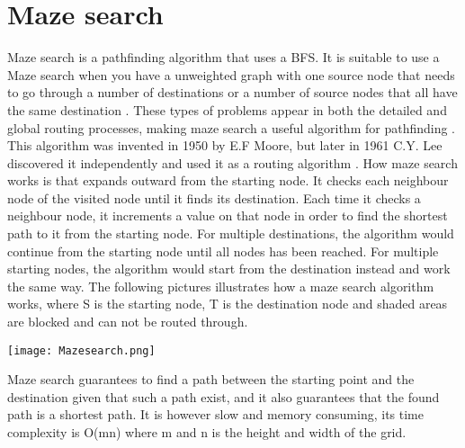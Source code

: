 \documentclass{kththesis}
\begin{document}
\section{Maze search}
Maze search is a pathfinding algorithm that uses a BFS. It is suitable to use a Maze search when you have a unweighted graph with one source node that needs to go through a number of destinations or a number of source nodes that all have the same destination \parencite{redbloggames}. These types of problems appear in both the detailed and global routing processes, making maze search a useful algorithm for pathfinding \parencite{EDA_routing}. This algorithm was invented in 1950 by E.F Moore, but later in 1961 C.Y. Lee discovered it independently and used it as a routing algorithm \parencite{idash}\parencite{lee}. 
How maze search works is that expands outward from the starting node. It checks each neighbour node of the visited node until it finds its destination. Each time it checks a neighbour node, it increments a value on that node in order to find the shortest path to it from the starting node. For multiple destinations, the algorithm would continue from the starting node until all nodes has been reached. For multiple starting nodes, the algorithm would start from the destination instead and work the same way. The following pictures illustrates how a maze search algorithm works, where S is the starting node, T is the destination node and shaded areas are blocked and can not be routed through.

\texttt{[image: Mazesearch.png]}

Maze search guarantees to find a path between the starting point and the destination given that such a path exist, and it also guarantees that the found path is a shortest path. It is however slow and memory consuming, its time complexity is O(mn) where m and n is the height and width of the grid. 
\end{document}
